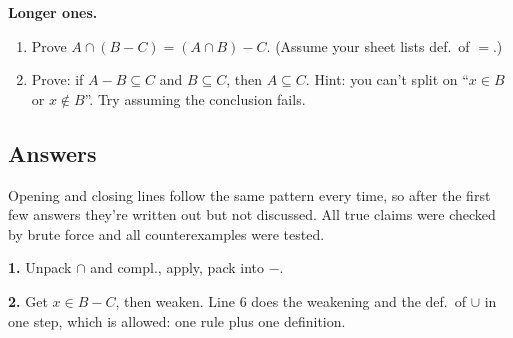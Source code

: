 \textbf{Longer ones.}
\begin{enumerate}[label=\arabic*.,leftmargin=1.8em,resume]
  \item Prove $A\cap(B-C)=(A\cap B)-C$. (Assume your sheet lists def.\ of $=$.)
  \item Prove: if $A-B\subseteq C$ and $B\subseteq C$, then $A\subseteq C$. Hint: you can't split on ``$x\in B$ or $x\notin B$''. Try assuming the conclusion fails.
\end{enumerate}

\subsection{Answers}

Opening and closing lines follow the same pattern every time, so after the first few answers they're written out but not discussed. All true claims were checked by brute force and all counterexamples were tested.

\textbf{1.} Unpack $\cap$ and compl., apply, pack into $-$.

\begin{center}
\end{center}

\textbf{2.} Get $x\in B-C$, then weaken. Line 6 does the weakening and the def.\ of $\cup$ in one step, which is allowed: one rule plus one definition.

